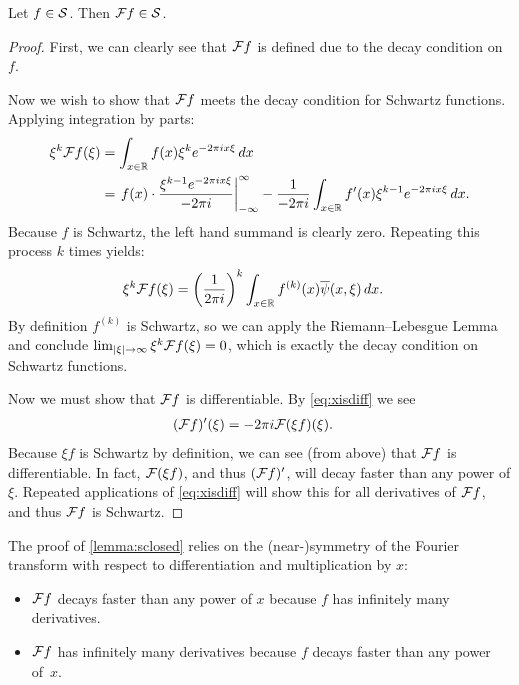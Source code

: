       \begin{lemma}
        \label{lemma:sclosed}
        Let $f\in\S$.
        Then $\F f\in\S$.
        \begin{proof}
          First, we can clearly see that $\F f$ is defined due to the decay condition on $f$.

          Now we wish to show that $\F f$ meets the decay condition for Schwartz functions.
          Applying integration by parts:
          \begin{align*}
            \xi^k\F f(\xi) &= \int_{x\in\R} f(x)\xi^ke^{-2\pi ix\xi}\,dx\\
            &= \left.f(x)\cdot\frac{\xi^{k-1}e^{-2\pi i x\xi}}{-2\pi i}\right|_{-\infty}^\infty - \frac{1}{-2\pi i}\int_{x\in\R} f'(x)\xi^{k-1}e^{-2\pi ix\xi}\,dx \text{.}
          \end{align*}
          Because $f$ is Schwartz, the left hand summand is clearly zero.
          Repeating this process $k$ times yields:
          \begin{align*}
            \xi^k\F f(\xi) &= \left(\frac{1}{2\pi i}\right)^k \int_{x\in\R}f^{(k)}(x)\overline\psi(x,\xi)\,dx \text{.}
          \end{align*}
          By definition $f^{(k)}$ is Schwartz, so we can apply the Riemann--Lebesgue Lemma and conclude $\lim_{|\xi|\rightarrow\infty} \xi^k\F f(\xi) = 0$, which is exactly the decay condition on Schwartz functions.

          Now we must show that $\F f$ is differentiable. 
          By \cref{eq:xisdiff} we see
          \begin{align*}
            (\F f)'(\xi) &= -2\pi i \F(\xi f)(\xi) \text{.}
          \end{align*}
          Because $\xi f$ is Schwartz by definition, we can see (from above) that $\F f$ is differentiable.
          In fact, $\F(\xi f)$, and thus $(\F f)'$, will decay faster than any power of $\xi$.
          Repeated applications of \cref{eq:xisdiff} will show this for all derivatives of $\F f$, and thus $\F f$ is Schwartz.
        \end{proof}
      \end{lemma}
      \begin{rmk}
        The proof of \cref{lemma:sclosed} relies on the (near-)symmetry of the Fourier transform with respect to differentiation and multiplication by $x$:
        \begin{itemize}
          \item $\F f$ decays faster than any power of $x$ because $f$ has infinitely many derivatives.
          \item $\F f$ has infinitely many derivatives because $f$ decays faster than any power of~$x$.
        \end{itemize}
      \end{rmk}

